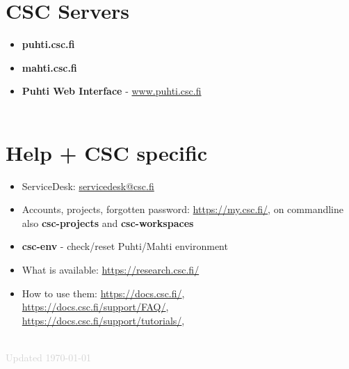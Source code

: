 \documentclass{article}
\begin{document}
\begin{Parallel}{0.48\textwidth}{0.48\textwidth}
{\section*{CSC Servers}
\begin{itemize}[itemsep=1ex,leftmargin=0cm,rightmargin=.52\textwidth]
    \item \textbf{puhti.csc.fi}
    \item \textbf{mahti.csc.fi}
    \item \textbf{Puhti Web Interface} - \href{https://www.puhti.csc.fi/}{www.puhti.csc.fi}
    \\
    \\
\end{itemize}
\section*{Help + CSC specific}
\begin{itemize}[itemsep=1ex,leftmargin=0cm,rightmargin=.52\textwidth]
    \item ServiceDesk: \href{mailto:servicedesk@csc.fi}{servicedesk@csc.fi}  
    \item Accounts, projects, forgotten password: \href{https://my.csc.fi/}{https://my.csc.fi/}, on commandline also \textbf{csc-projects} and \textbf{csc-workspaces}
    \item \textbf{csc-env} - check/reset Puhti/Mahti environment
    \item What is available: \href{https://research.csc.fi/}{https://research.csc.fi/}
    \item How to use them: \href{https://docs.csc.fi/}{https://docs.csc.fi/},\\
          \href{https://docs.csc.fi/support/FAQ/}{https://docs.csc.fi/support/FAQ/},\\
          \href{https://docs.csc.fi/support/tutorials/}{https://docs.csc.fi/support/tutorials/},
    \\
    \\
\end{itemize}
}
\ParallelPar
\end{Parallel}





\textcolor{lightgray}{Updated \today}
\end{document}
